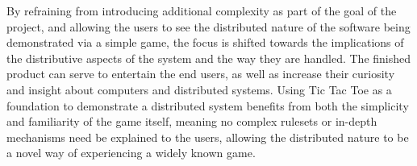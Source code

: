 \documentclass[conference]{IEEEtran}
\begin{document}
By refraining from introducing additional complexity as part of the goal of the project, and 
allowing the users to see the distributed nature of the software being demonstrated via a simple game, the focus is shifted towards the implications of the distributive aspects of the system and the way they are handled. The finished product can serve to entertain the end users, as well as increase their curiosity and insight about computers and distributed systems. Using Tic Tac Toe as a foundation to demonstrate a distributed system benefits from both the simplicity and familiarity of the game itself, meaning no complex rulesets or in-depth mechanisms need be explained to the users, allowing the distributed nature to be a novel way of experiencing a widely known game.

%
%


%
%
\end{document}
